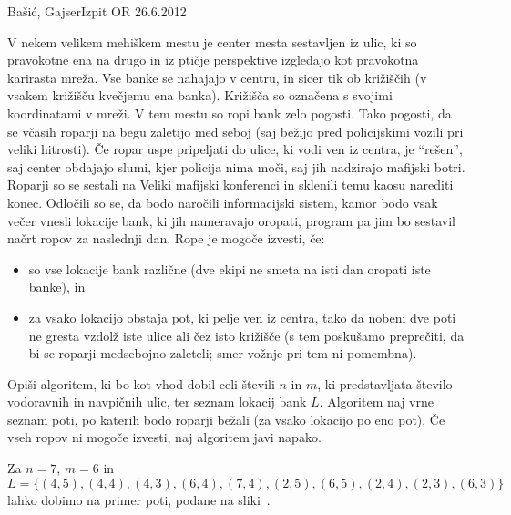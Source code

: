 \begin{naloga}{Bašić, Gajser}{Izpit OR 26.6.2012}
\begin{vprasanje}
V nekem velikem mehiškem mestu je center mesta sestavljen iz ulic,
ki so pravokotne ena na drugo
in iz ptičje perspektive izgledajo kot pravokotna karirasta mreža.
Vse banke se nahajajo v centru,
in sicer tik ob križiščih (v vsakem križišču kvečjemu ena banka).
Križišča so označena s svojimi koordinatami v mreži.
V tem mestu so ropi bank zelo pogosti.
Tako pogosti, da se včasih roparji na begu zaletijo med seboj
(saj bežijo pred policijskimi vozili pri veliki hitrosti).
Če ropar uspe pripeljati do ulice, ki vodi ven iz centra, je ``rešen'',
saj center obdajajo slumi, kjer policija nima moči,
saj jih nadzirajo mafijski botri.
Roparji so se sestali na Veliki mafijski konferenci
in sklenili temu kaosu narediti konec.
Odločili so se, da bodo naročili informacijski sistem,
kamor bodo vsak večer vnesli lokacije bank, ki jih nameravajo oropati,
program pa jim bo sestavil načrt ropov za naslednji dan.
Rope je mogoče izvesti, če:
\begin{itemize}
\item so vse lokacije bank različne
(dve ekipi ne smeta na isti dan oropati iste banke), in
\item za vsako lokacijo obstaja pot, ki pelje ven iz centra,
tako da nobeni dve poti ne gresta vzdolž iste ulice ali čez isto križišče
(s tem poskušamo preprečiti, da bi se roparji medsebojno zaleteli;
smer vožnje pri tem ni pomembna).
\end{itemize}
Opiši algoritem, ki bo kot vhod dobil celi števili $n$ in $m$,
ki predstavljata število vodoravnih in navpičnih ulic,
ter seznam lokacij bank $L$.
Algoritem naj vrne seznam poti,
po katerih bodo roparji bežali (za vsako lokacijo po eno pot).
Če vseh ropov ni mogoče izvesti, naj algoritem javi napako.

Za $n = 7$, $m = 6$ in
$$
L = \{(4, 5), (4, 4), (4, 3), (6, 4), (7, 4),
      (2, 5), (6, 5), (2, 4), (2, 3), (6, 3)\}
$$
lahko dobimo na primer poti, podane na sliki~\fig.

\begin{slika}
\pgfslika
{}
\end{slika}
\end{vprasanje}


\end{naloga}
